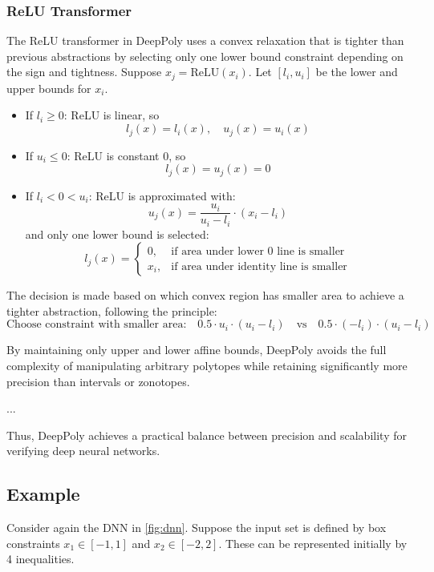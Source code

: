\documentclass[oneside,11pt,dvipsnames]{book}
\numberwithin{equation}{section}
\theoremstyle{definition}
\theoremstyle{remark}
\begin{document}
\subsubsection{ReLU Transformer}

The ReLU transformer in DeepPoly uses a convex relaxation that is tighter than previous abstractions by selecting only one lower bound constraint depending on the sign and tightness. Suppose \(x_j = \text{ReLU}(x_i)\). Let \([l_i, u_i]\) be the lower and upper bounds for \(x_i\).

\begin{itemize}
    \item If \(l_i \geq 0\): ReLU is linear, so
    \[
    l_j(x) = l_i(x), \quad u_j(x) = u_i(x)
    \]

    \item If \(u_i \leq 0\): ReLU is constant 0, so
    \[
    l_j(x) = u_j(x) = 0
    \]

    \item If \(l_i < 0 < u_i\): ReLU is approximated with:
    \[
    u_j(x) = \frac{u_i}{u_i - l_i} \cdot (x_i - l_i)
    \]
    and only one lower bound is selected:
    \[
    l_j(x) =
    \begin{cases}
        0, & \text{if area under lower 0 line is smaller} \\
        x_i, & \text{if area under identity line is smaller}
    \end{cases}
    \]
\end{itemize}

The decision is made based on which convex region has smaller area to achieve a tighter abstraction, following the principle:
\[
\text{Choose constraint with smaller area:} \quad 0.5 \cdot u_i \cdot (u_i - l_i) \quad \text{vs} \quad 0.5 \cdot (-l_i) \cdot (u_i - l_i)
\]


By maintaining only upper and lower affine bounds, DeepPoly avoids the full complexity of manipulating arbitrary polytopes while retaining significantly more precision than intervals or zonotopes. 

...

Thus, DeepPoly achieves a practical balance between precision and scalability for verifying deep neural networks.

\subsection{Example}

Consider again the DNN in \autoref{fig:dnn}. Suppose the input set is defined by box constraints \(x_1 \in [-1,1]\) and \(x_2 \in [-2,2]\). These can be represented initially by 4 inequalities.
\end{document}
